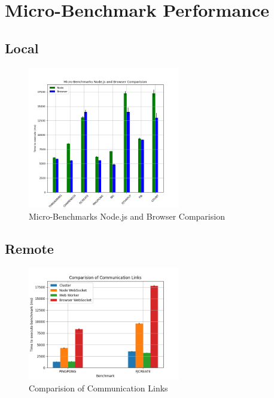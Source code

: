 \documentclass[12pt, a4paper]{report}
\theoremstyle{definition}
\theoremstyle{definition}%
\theoremstyle{definition}%
\theoremstyle{definition}%
\theoremstyle{definition}%
\theoremstyle{definition}%
\begin{document}
\section{Micro-Benchmark Performance}
\subsection{Local}
\begin{figure}[H]
    \begin{centering}
        \includegraphics[width=250px]{../../benchmarks/visualisations/micro.png}
        \caption{Micro-Benchmarks Node.js and Browser Comparision}
    \end{centering}
\end{figure}
\subsection{Remote}
\begin{figure}[H]
    \begin{centering}
        \includegraphics[width=250px]{../../benchmarks/visualisations/link.png}
        \caption{Comparision of Communication Links}
    \end{centering}
\end{figure}
\end{document}
